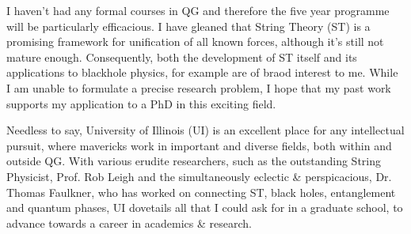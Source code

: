 I haven't had any formal courses in QG and therefore the five year programme will be particularly efficacious. I have gleaned that String Theory (ST) is a promising framework for unification of all known forces, although it's still not mature enough. Consequently, both the development of ST itself and its applications to blackhole physics, for example are of braod interest to me. While I am unable to formulate a precise research problem, I hope that my past work supports my application to a PhD in this exciting field.

Needless to say, University of Illinois (UI) is an excellent place for any intellectual pursuit, where mavericks work in important and diverse fields, both within and outside QG. With various erudite researchers, such as the outstanding String Physicist, Prof. Rob Leigh and the simultaneously eclectic \& perspicacious, Dr. Thomas Faulkner, who has worked on connecting ST, black holes, entanglement and quantum phases, UI dovetails all that I could ask for in a graduate school, to advance towards a career in academics \& research. %



